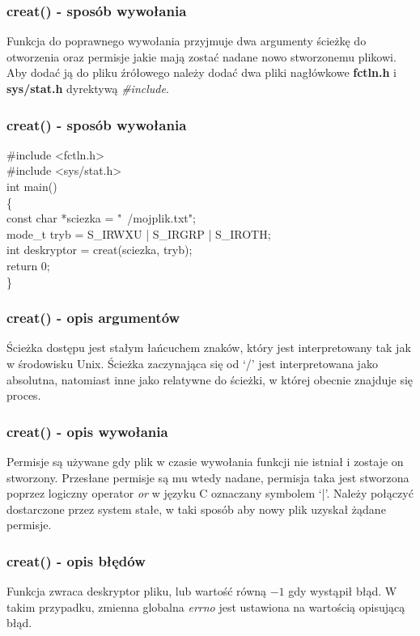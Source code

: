 \documentclass{beamer}
\begin{document}
\begin{frame}
	\frametitle{creat() - sposób wywołania}
Funkcja do poprawnego wywołania przyjmuje dwa argumenty ścieżkę do otworzenia oraz permisje jakie mają zostać nadane nowo stworzonemu plikowi.
Aby dodać ją do pliku źrółowego należy dodać dwa pliki nagłówkowe \textbf{fctln.h} i \textbf{sys/stat.h} dyrektywą \textit{\#include}.
\end{frame}

\begin{frame}
	\frametitle{creat() - sposób wywołania}
\#include <fctln.h>\\
\#include <sys/stat.h>\\
int main()\\
\{\\
	const char *sciezka = "~/mojplik.txt";\\
	mode\_t tryb = S\_IRWXU | S\_IRGRP | S\_IROTH;\\
	int deskryptor = creat(sciezka, tryb);\\
	return 0;\\
\}
\end{frame}

\begin{frame}
	\frametitle{creat() - opis argumentów}
Ścieżka dostępu jest stałym łańcuchem znaków, który jest interpretowany tak jak w środowisku Unix.
Ścieżka zaczynająca się od `/' jest interpretowana jako absolutna, natomiast inne jako relatywne do
ścieżki, w której obecnie znajduje się proces.
\end{frame}

\begin{frame}
	\frametitle{creat() - opis wywołania}
Permisje są używane gdy plik w czasie wywołania funkcji nie istniał i zostaje on stworzony.
Przesłane permisje są mu wtedy nadane, permisja taka jest stworzona poprzez logiczny operator
\textit{or} w języku C oznaczany symbolem `|'. Należy połączyć dostarczone przez system stałe,
w taki sposób aby nowy plik uzyskał żądane permisje.
\end{frame}

\begin{frame}
	\frametitle{creat() - opis błędów}
Funkcja zwraca deskryptor pliku, lub wartość równą $-1$ gdy wystąpił błąd.
W takim przypadku, zmienna globalna \textit{errno} jest ustawiona na wartością opisującą błąd.
\end{frame}
\end{document}
